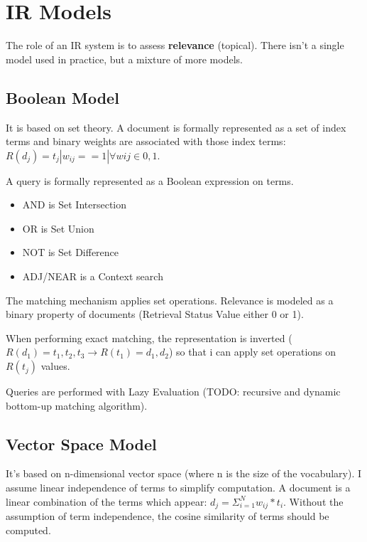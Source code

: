 \chapter{IR Models}

The role of an IR system is to assess \textbf{relevance} (topical).
There isn't a single model used in practice, but a mixture of more models.

\section{Boolean Model}

It is based on set theory.
A document is formally represented as a set of index terms and binary weights are associated with those index terms: $R(d_j) = { t_j | w_{ij} == 1 | \forall wij \in {0,1}}$.

A query is formally represented as a Boolean expression on terms.
\begin{itemize}
  \item AND is Set Intersection
  \item OR is Set Union
  \item NOT is Set Difference
  \item ADJ/NEAR is a Context search
\end{itemize}
The matching mechanism applies set operations.
Relevance is modeled as a binary property of documents (Retrieval Status Value either 0 or 1).

When performing exact matching, the representation is inverted ($R(d_1) = {t_1, t_2, t_3} \rightarrow R(t_1) = {d_1, d_2}$) so that i can apply set operations on $R(t_j)$ values.

Queries are performed with Lazy Evaluation (TODO: recursive and dynamic bottom-up matching algorithm).

\section{Vector Space Model}

It's based on n-dimensional vector space (where n is the size of the  vocabulary).
I assume linear independence of terms to simplify computation.
A document is a linear combination of the terms which appear: $d_j = \Sigma ^{N} _{i = 1} w_{ij} * t_i$.
Without the assumption of term independence, the cosine similarity of terms should be computed.
